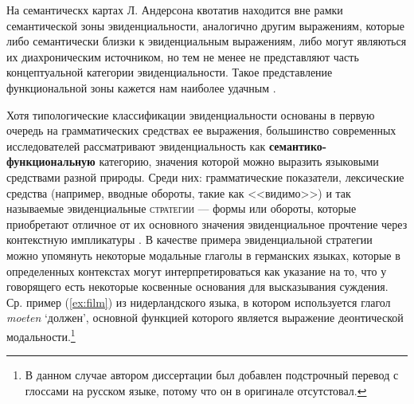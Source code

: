 На семантическх картах Л. Андерсона квотатив находится вне рамки семантической зоны эвиденциальности, аналогично другим выражениям, которые либо семантически близки к эвиденциальным выражениям, либо могут являються их диахроническим источником, но тем не менее не представляют часть концептуальной категории эвиденциальности. Такое представление функциональной зоны кажется нам наиболее удачным \citep[307]{anderson1986}. \color{purple} 
\par Хотя типологические классификации эвиденциальности основаны в первую очередь на грамматических средствах ее выражения, большинство современных исследователей рассматривают эвиденциальность как \textbf{семантико-функциональную} категорию, значения которой можно выразить языковыми средствами разной природы. Среди них: грамматические показатели, лексические средства (например, вводные обороты, такие как <<видимо>>) и так называемые эвиденциальные \textsc{стратегии} --- формы или обороты, которые приобретают отличное от их основного значения эвиденциальное прочтение через контекстную импликатуры \citep[105--152]{aikhenvald2004}. \color{black}
В качестве примера эвиденциальной стратегии можно упомянуть некоторые модальные глаголы в германских языках, которые в определенных контекстах могут интерпретироваться как указание на то, что у говорящего есть некоторые косвенные основания для высказывания суждения. Ср. пример (\ref{ex:film}) из нидерландского языка, в котором используется глагол \textit{moeten} `должен', основной функцией которого является выражение деонтической модальности.\footnote{В данном случае автором диссертации был добавлен подстрочный перевод с глоссами на русском языке, потому что он в оригинале отсутстовал.} 


